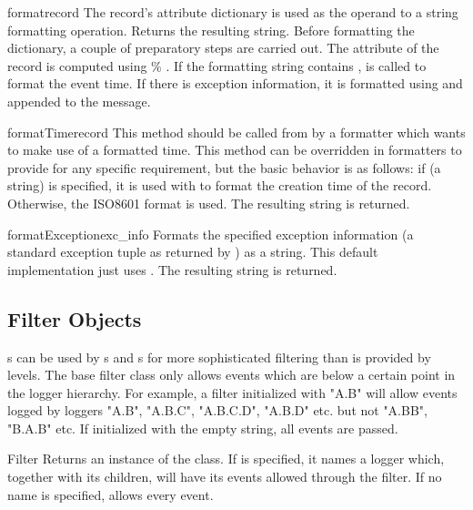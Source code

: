 \begin{methoddesc}{format}{record}
The record's attribute dictionary is used as the operand to a
string formatting operation. Returns the resulting string.
Before formatting the dictionary, a couple of preparatory steps
are carried out. The  attribute of the record is computed
using  \% . If the formatting string contains
,  is called to format the
event time. If there is exception information, it is formatted using
 and appended to the message.
\end{methoddesc}

\begin{methoddesc}{formatTime}{record}
This method should be called from  by a formatter which
wants to make use of a formatted time. This method can be overridden
in formatters to provide for any specific requirement, but the
basic behavior is as follows: if  (a string) is specified,
it is used with  to format the creation time of the
record. Otherwise, the ISO8601 format is used. The resulting
string is returned.
\end{methoddesc}

\begin{methoddesc}{formatException}{exc_info}
Formats the specified exception information (a standard exception tuple
as returned by ) as a string. This default
implementation just uses .
The resulting string is returned.
\end{methoddesc}

\subsection{Filter Objects}

s can be used by s and s for
more sophisticated filtering than is provided by levels. The base filter
class only allows events which are below a certain point in the logger
hierarchy. For example, a filter initialized with "A.B" will allow events
logged by loggers "A.B", "A.B.C", "A.B.C.D", "A.B.D" etc. but not "A.BB",
"B.A.B" etc. If initialized with the empty string, all events are passed.

\begin{classdesc}{Filter}{}
Returns an instance of the  class. If  is specified,
it names a logger which, together with its children, will have its events
allowed through the filter. If no name is specified, allows every event.
\end{classdesc}

